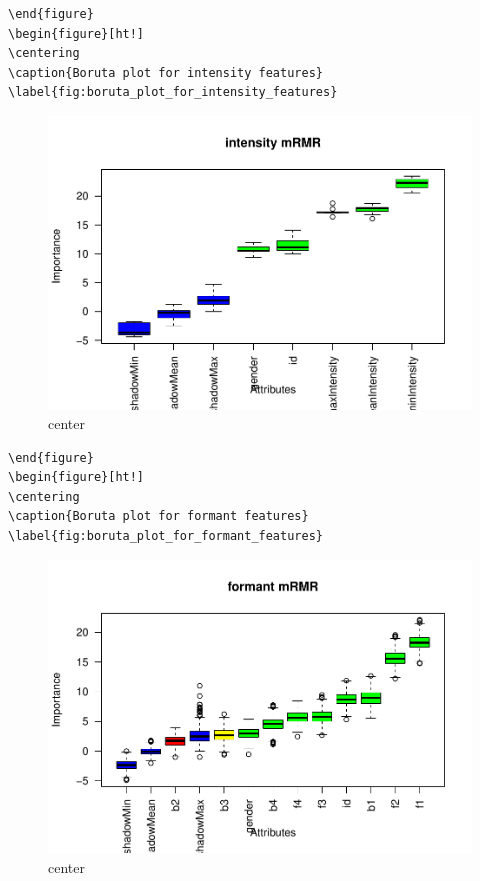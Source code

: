 \documentclass[
]{article}
\begin{document}
\begin{verbatim}
\end{figure}
\begin{figure}[ht!]
\centering
\caption{Boruta plot for intensity features}
\label{fig:boruta_plot_for_intensity_features}
\end{verbatim}

\begin{figure}
\includegraphics[width=1\linewidth,height=1\textheight]{figure/unnamed-chunk-7-2} \caption{center}\label{fig:unnamed-chunk-7-2}
\end{figure}

\begin{verbatim}
\end{figure}
\begin{figure}[ht!]
\centering
\caption{Boruta plot for formant features}
\label{fig:boruta_plot_for_formant_features}
\end{verbatim}

\begin{figure}
\includegraphics[width=1\linewidth,height=1\textheight]{figure/unnamed-chunk-7-3} \caption{center}\label{fig:unnamed-chunk-7-3}
\end{figure}
\end{document}
